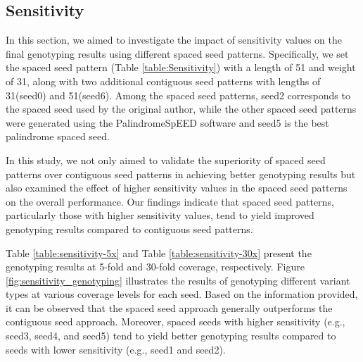 \documentclass{PHlab-thesis}
\begin{document}
\subsection{Sensitivity}
In this section, we aimed to investigate the impact of sensitivity values on the final genotyping results using different spaced seed patterns. Specifically, we set the spaced seed pattern (Table \ref{table:Sensitivity}) with a length of 51 and weight of 31, along with two additional contiguous seed patterns with lengths of 31(seed0) and 51(seed6). Among the spaced seed patterns, seed2 corresponds to the spaced seed used by the original author, while the other spaced seed patterns were generated using the PalindromeSpEED software and seed5 is the best palindrome spaced seed.

In this study, we not only aimed to validate the superiority of spaced seed patterns over contiguous seed patterns in achieving better genotyping results but also examined the effect of higher sensitivity values in the spaced seed patterns on the overall performance. Our findings indicate that spaced seed patterns, particularly those with higher sensitivity values, tend to yield improved genotyping results compared to contiguous seed patterns.

Table \ref{table:sensitivity-5x} and Table \ref{table:sensitivity-30x} present the genotyping results at 5-fold and 30-fold coverage, respectively. Figure \ref{fig:sensitivity_genotyping} illustrates the results of genotyping different variant types at various coverage levels for each seed. Based on the information provided, it can be observed that the spaced seed approach generally outperforms the contiguous seed approach. Moreover, spaced seeds with higher sensitivity (e.g., seed3, seed4, and seed5) tend to yield better genotyping results compared to seeds with lower sensitivity (e.g., seed1 and seed2).
\end{document}
